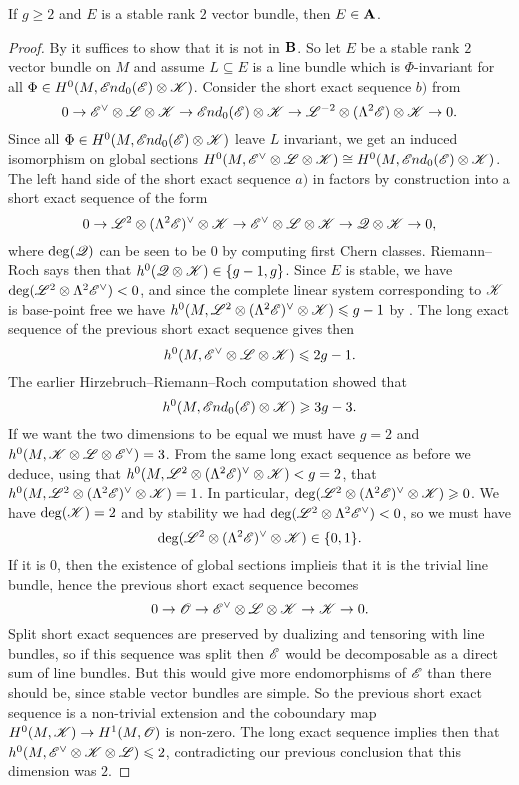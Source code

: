 \documentclass[A4paper, 12pt, british, reqno]{amsart}
\newcommand{\ot}{\otimes}
\newcommand{\dual}{^{\vee}}
\begin{document}
\begin{lm}\label{lm:stable}
    If $g\geqslant 2$ and $E$ is a stable rank $2$ vector bundle, then $E\in \mathbf{A}$.
    \begin{proof}
	By  it suffices to show that it is not in $\mathbf{B}$.
	So let $E$ be a stable rank $2$ vector bundle on $M$ and assume $L\subseteq E$ is a line bundle which is $\Phi$-invariant for all $\Phi\in H^{0}(M,\sEnd_{0}(\E)\ot \sK)$.
	Consider the short exact sequence $b)$ from 
	\[ 0\to \E\dual\ot \L\ot\sK\to \sEnd_{0}(\E)\ot \sK \to \L^{-2}\ot (\Lambda^{2}\E)\ot\sK\to 0. \]
	Since all $\Phi\in H^{0}(M,\sEnd_{0}(\E)\ot\sK)$ leave $L$ invariant, we get an induced isomorphism on global sections $H^{0}(M,\E\dual\ot\L\ot\sK)\cong H^{0}(M,\sEnd_{0}(\E)\ot \sK)$.
	The left hand side of the short exact sequence $a)$ in  factors by construction into a short exact sequence of the form 
	\[ 0\to \L^{2}\ot (\Lambda^{2}\E)\dual\ot\sK \to \E\dual \ot \L\ot \sK\to \sQ\ot\sK\to 0, \]
	where $\deg(\mathscr{Q})$ can be seen to be $0$ by computing first Chern classes.
	Riemann--Roch says then that $h^{0}(\sQ\ot\sK)\in \{g-1,g\}$.
	Since $E$ is stable, we have $\deg(\L^{2}\ot \Lambda^{2}\E\dual)<0$, and since the complete linear system corresponding to $\mathscr{K}$ is base-point free \cite[Lemma IV.5.1]{har77}
	    we have $h^{0}(M,\L^{2}\ot(\Lambda^{2}\E)\dual\ot\sK)\leqslant g-1$ by \cite[Proposition IV.3.1]{har77}.
	The long exact sequence of the previous short exact sequence gives then
	\[ h^{0}(M,\E\dual\ot\L\ot\sK)\leqslant 2g-1. \]
	The earlier Hirzebruch--Riemann--Roch computation showed that
	\[ h^{0}(M,\sEnd_{0}(\E)\ot \sK)\geqslant 3g-3. \]
	If we want the two dimensions to be equal we must have $g=2$ and $h^{0}(M,\sK\ot\L\ot\E\dual)=3$.
	From the same long exact sequence as before we deduce, using that $h^{0}(M,\L^{2}\ot (\Lambda^{2}\E)\dual\ot \sK)<g=2$, that $h^{0}(M,\L^{2}\ot(\Lambda^{2}\E)\dual\ot\sK)=1$.
	In particular, $\deg(\L^{2}\ot(\Lambda^{2}\E)\dual\ot\sK)\geqslant 0$.
	We have $\deg(\mathscr{K})=2$ and by stability we had $\deg(\L^{2}\ot \Lambda^{2}\E\dual)<0$, so we must have
	\[ \deg(\L^{2}\ot (\Lambda^{2}\E)\dual\ot\sK)\in \{0,1\}. \]
	If it is $0$, then the existence of global sections implieis that it is the trivial line bundle, hence the previous short exact sequence becomes
	\[ 0\to \O\to \E\dual\ot\L\ot\sK\to \sK\to 0. \]
	Split short exact sequences are preserved by dualizing and tensoring with line bundles, so if this sequence was split then $\mathscr{E}$ would be decomposable as a direct sum of line bundles.
	But this would give more endomorphisms of $\mathscr{E}$ than there should be, since stable vector bundles are simple.
	So the previous short exact sequence is a non-trivial extension and the coboundary map $H^{0}(M,\mathscr{K})\to H^{1}(M,\mathscr{O})$ is non-zero.
	The long exact sequence implies then that $h^{0}(M,\E\dual\ot \sK\ot\L)\leqslant 2$, contradicting our previous conclusion that this dimension was $2$.


\end{proof}
\end{lm}
\end{document}
